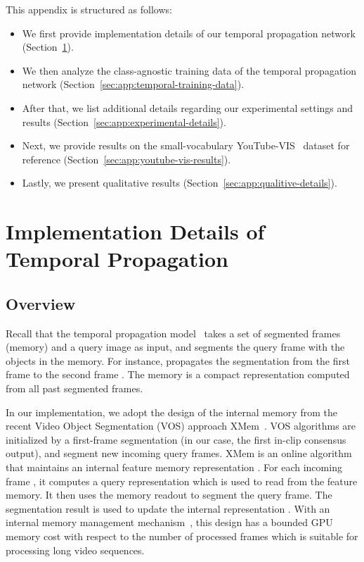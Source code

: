 \appendix
\beginsupplement
\noindent This appendix is structured as follows:
\begin{itemize}
    \item We first provide implementation details of our temporal propagation network (Section~\ref{sec:app:temporal-details}).
    \item We then analyze the class-agnostic training data of the temporal propagation network (Section~\ref{sec:app:temporal-training-data}).
    \item After that, we list additional details regarding our experimental settings and results (Section~\ref{sec:app:experimental-details}).
    \item Next, we provide results on the small-vocabulary YouTube-VIS~\cite{yang2019video} dataset for reference (Section~\ref{sec:app:youtube-vis-results}).
    \item Lastly, we present qualitative results (Section~\ref{sec:app:qualitive-details}).
\end{itemize}

\section{Implementation Details of Temporal Propagation}\label{sec:app:temporal-details}
\subsection{Overview}
Recall that the temporal propagation model~ takes a set of segmented frames (memory)  and a query image  as input, and segments the query frame with the objects in the memory. 
For instance,  propagates the segmentation  from the first frame  to the second frame . 
The memory  is a compact representation computed from all past segmented frames.

In our implementation, we adopt the design of the internal memory  from the recent Video Object Segmentation (VOS) approach XMem~\cite{cheng2022xmem}. 
VOS algorithms are initialized by a first-frame segmentation (in our case, the first in-clip consensus output), and segment new incoming query frames.
XMem is an online algorithm that maintains an internal feature memory representation . For each incoming frame , it computes a query representation which is used to read from the feature memory. It then uses the memory readout  to segment the query frame. The segmentation result  is used to update the internal representation . 
With an internal memory management mechanism~\cite{cheng2022xmem}, this design has a bounded GPU memory cost with respect to the number of processed frames which is suitable for processing long video sequences.


